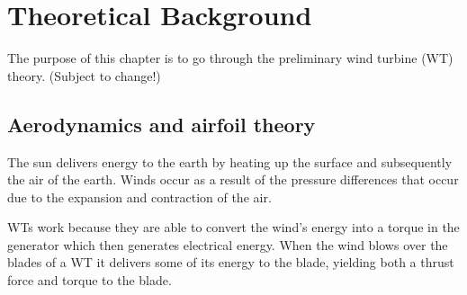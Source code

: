 \section{Theoretical Background} \label{sec:theory}
The purpose of this chapter is to go through the preliminary wind turbine (WT) theory. (Subject to change!)

\subsection{Aerodynamics and airfoil theory}
The sun delivers energy to the earth by heating up the surface and subsequently the air of the earth. Winds occur as a result of the pressure differences that occur due to the expansion and contraction of the air. 

WTs work because they are able to convert the wind's energy into a torque in the generator which then generates electrical energy. When the wind blows over the blades of a WT it delivers some of its energy to the blade, yielding both a thrust force and torque to the blade.

